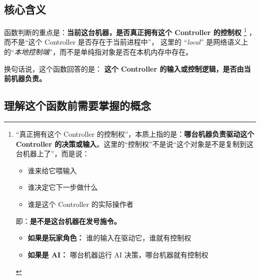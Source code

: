 \subsection{核心含义}
函数判断的重点是：\textbf{当前这台机器，是否真正拥有这个 Controller 的控制权}
\footnote{“真正拥有这个 Controller 的控制权”，本质上指的是：\textbf{哪台机器负责驱动这个 Controller 的决策或输入}。这里的“控制权”不是说“这个对象是不是复制到这台机器上了”，而是说：
	\begin{itemize}
		\item 谁来给它喂输入
		\item 谁决定它下一步做什么
		\item 谁是这个 Controller 的实际操作者
	\end{itemize}
	即：\textbf{是不是这台机器在发号施令。}
	\begin{itemize}
		\item \textbf{如果是玩家角色：}	谁的输入在驱动它，谁就有控制权
		\item \textbf{如果是 AI：}	哪台机器运行 AI 决策，哪台机器就有控制权
	\end{itemize}	
}
，而不是“这个 Controller 是否存在于当前进程中”，
这里的 ``\emph{local}'' 是网络语义上的“\emph{本地控制端}”，而不是单纯指对象是否在本机内存中存在。

换句话说，这个函数回答的是：	\textbf{这个 Controller 的输入或控制逻辑，是否由当前机器负责。}

\subsection{理解这个函数前需要掌握的概念}

